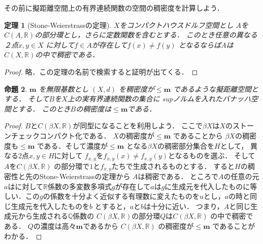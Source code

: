 \documentclass[leqno, a4paper, 12pt]{jsarticle}
\newtheorem{thm}{定理}
\newtheorem{prop}[thm]{命題}
\newcommand{\qq}{\mathbb{Q}}
\newcommand{\rr}{\mathbb{R}}
\begin{document}
その前に擬距離空間上の有界連続関数の空間の稠密度を計算しよう．
\begin{thm}[Stone-Weierstrassの定理]
$X$をコンパクトハウスドルフ空間とし
$A$を$C(A, \rr)$の部分環とし，さらに定数関数を含むとする．
このとき任意の異なる２点$x, y\in X$
に対して$f\in A$が存在して$f(x)\neq f(y)$
となるならば$A$は$C(X, \rr)$の中で稠密である．
\end{thm}
\begin{proof}
略．この定理の名前で検索すると証明が出てくる．
\end{proof}
\begin{prop}
$\mathbf{m}$
を無限基数とし
$(X, d)$
を稠密度が$\le \mathbf{m}$
であるような擬距離空間とする．
そして$B$を$X$上の実有界連続関数の集合に
supノルムを入れたバナッハ空間とする．
このとき$B$の稠密度は$\le \mathbf{m}$である．
\end{prop}
\begin{proof}
$B$と$C(\beta X, \rr)$が同型になることを利用しよう．
ここで$\beta X$は$X$のストーンチェックコンパクト化である．
$X$の稠密度が$\le \mathbf{m}$
であることから
$\beta X$の稠密度も$\le \mathbf{m}$
である．そして濃度が$\le \mathbf{m}$
となる$\beta X$の稠密部分集合を$H$として，
異なる2点$x, y\in H$に対して
$f_{x, y}$を$f_{x, y}(x)\neq f_{x, y}(y)$となるものを選ぶ．
そして$A$を$C(\beta X, \rr)$
の部分環で$1$と$f_{x, y}$たちで生成されるものとする．
すると$H$の稠密性と先のStone-Weierstrassの定理から
$A$は稠密である．
ところで$A$の任意の元$a$はに対して$\rr$係数の多変数多項式$g$が存在して$a$は$g$に生成元を代入したものに等しい．この$g$の係数を十分よく近似する有理数に変えたものを$u$とし，$a$の時と同じ生成元を代入したものを$b$
とすると，$a$と$b$は十分に近い．
つまり，$A$と同じ生成元から生成される$\qq$係数の
$C(\beta X, \rr)$の部分環$Q$は$C(\beta X, \rr)$
の中で稠密である．
$Q$の濃度は高々$\mathbf{m}$であるから
$C(\beta X, \rr)$
の稠密度が$\le \mathbf{m}$
であることがわかる．
\end{proof}
\end{document}
